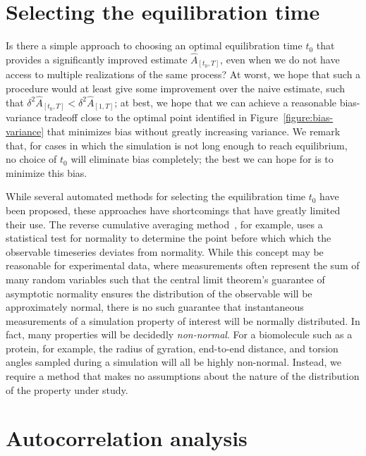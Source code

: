 \documentclass[aps,pre,twocolumn,nofootinbib,superscriptaddress,linenumbers,11point]{revtex4-1}
\begin{document}
\section*{Selecting the equilibration time}

Is there a simple approach to choosing an optimal equilibration time $t_0$ that provides a significantly improved estimate $\hat{A}_{[t_0,T]}$, even when we do not have access to multiple realizations of the same process?
At worst, we hope that such a procedure would at least give some improvement over the naive estimate, such that $\delta^2 \hat{A}_{[t_0,T]} < \delta^2 \hat{A}_{[1,T]}$; at best, we hope that we can achieve a reasonable bias-variance tradeoff close to the optimal point identified in Figure~\ref{figure:bias-variance} that minimizes bias without greatly increasing variance.
We remark that, for cases in which the simulation is not long enough to reach equilibrium, no choice of $t_0$ will eliminate bias completely; the best we can hope for is to minimize this bias.

While several automated methods for selecting the equilibration time $t_0$ have been proposed, these approaches have shortcomings that have greatly limited their use.
The reverse cumulative averaging method~\cite{yang-karplus:2004:jcp:reverse-cumulative-averaging}, for example, uses a statistical test for normality to determine the point before which which the observable timeseries deviates from normality.
While this concept may be reasonable for experimental data, where measurements often represent the sum of many random variables such that the central limit theorem's guarantee of asymptotic normality ensures the distribution of the observable will be approximately normal, there is no such guarantee that instantaneous measurements of a simulation property of interest will be normally distributed.
In fact, many properties will be decidedly \emph{non-normal}.
For a biomolecule such as a protein, for example, the radius of gyration, end-to-end distance, and torsion angles sampled during a simulation will all be highly non-normal.
Instead, we require a method that makes no assumptions about the nature of the distribution of the property under study.

\section*{Autocorrelation analysis}
\label{section:statistical-inefficiency}
\end{document}
